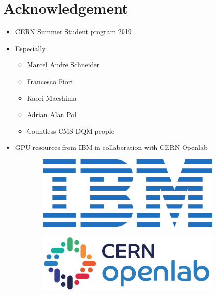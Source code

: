 \chapter*{Acknowledgement}


\begin{itemize}
    \item CERN Summer Student program 2019
    \item Especially
    \begin{itemize}
        \item Marcel Andre Schneider
        \item Francesco Fiori
        \item Kaori Maeshima
        \item Adrian Alan Pol
        \item Countless CMS DQM people
    \end{itemize}
    \item GPU resources from IBM in collaboration with CERN Openlab
\end{itemize}

\begin{figure}[h!]
    \begin{subfigure}[b]{0.8in}
        \includegraphics[width=\linewidth]{images/ibm.png}
    \end{subfigure}
    \begin{subfigure}[b]{1.2in}
        \includegraphics[width=\linewidth]{images/cern_openlab.png}
    \end{subfigure}
\end{figure}